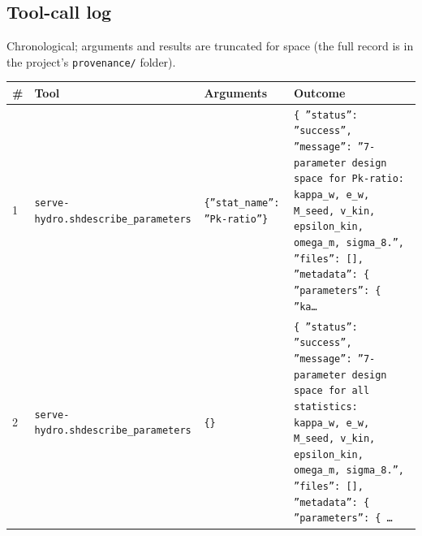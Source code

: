 \documentclass[11pt,a4paper]{article}
\begin{document}
\subsection{Tool-call log}
Chronological; arguments and results are truncated for space (the full record is in the project's \texttt{provenance/} folder).
\begin{longtable}{@{}p{}p{}p{}p{}@{}}
\toprule \# & Tool & Arguments & Outcome \\ \midrule \endhead
1 & \texttt{serve-hydro.sh}\newline\texttt{describe\_\allowbreak{}parameters} & \texttt{\{''stat\_\allowbreak{}name'':\allowbreak{} ''Pk-ratio''\}\allowbreak{}} & \texttt{\{   ''status'':\allowbreak{} ''success'',\allowbreak{}   ''message'':\allowbreak{} ''7-parameter design space for Pk-ratio:\allowbreak{} kappa\_\allowbreak{}w,\allowbreak{} e\_\allowbreak{}w,\allowbreak{} M\_\allowbreak{}seed,\allowbreak{} v\_\allowbreak{}kin,\allowbreak{} epsilon\_\allowbreak{}kin,\allowbreak{} omega\_\allowbreak{}m,\allowbreak{} sigma\_\allowbreak{}8.'',\allowbreak{}   ''files'':\allowbreak{} []\allowbreak{},\allowbreak{}   ''metadata'':\allowbreak{} \{     ''parameters'':\allowbreak{} \{       ''ka\ldots{}\allowbreak{}} \\
2 & \texttt{serve-hydro.sh}\newline\texttt{describe\_\allowbreak{}parameters} & \texttt{\{\}\allowbreak{}} & \texttt{\{   ''status'':\allowbreak{} ''success'',\allowbreak{}   ''message'':\allowbreak{} ''7-parameter design space for all statistics:\allowbreak{} kappa\_\allowbreak{}w,\allowbreak{} e\_\allowbreak{}w,\allowbreak{} M\_\allowbreak{}seed,\allowbreak{} v\_\allowbreak{}kin,\allowbreak{} epsilon\_\allowbreak{}kin,\allowbreak{} omega\_\allowbreak{}m,\allowbreak{} sigma\_\allowbreak{}8.'',\allowbreak{}   ''files'':\allowbreak{} []\allowbreak{},\allowbreak{}   ''metadata'':\allowbreak{} \{     ''parameters'':\allowbreak{} \{    \ldots{}\allowbreak{}} \\

\end{longtable}
\end{document}
